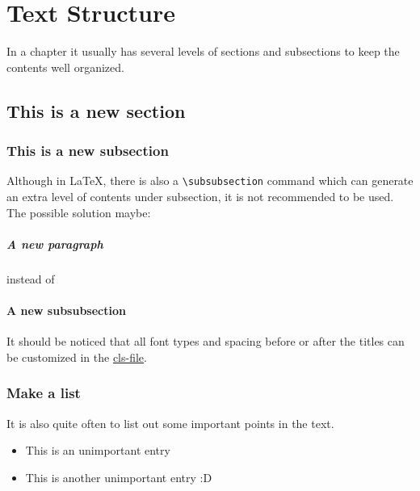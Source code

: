 \chapter{Text Structure}

\graphicspath{ {graphics/Chapter3/} }

In a chapter it usually has several levels of sections and subsections to keep the contents well organized. 

\section{This is a new section}

	\subsection{This is a new subsection}
	
		Although in \LaTeX, there is also a {\verb!\subsubsection!} command which can generate an extra level of contents under subsection, it is not recommended to be used. The possible solution maybe:
		
		\paragraph{\colorbox{yellow!50}{A new paragraph}}
		
		instead of 
		
		\subsubsection{\colorbox{yellow!50}{A new subsubsection}}
		
		It should be noticed that all font types and spacing before or after the titles can be customized in the \href{thesis-template.cls}{cls-file}.
		
	\subsection{Make a list}
		
		It is also quite often to list out some important points in the text.
		
		\begin{itemize}
			\item This is an unimportant entry
			\item This is another unimportant entry :D
		\end{itemize}